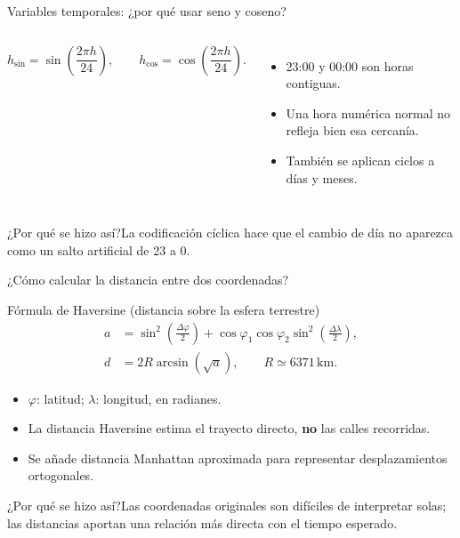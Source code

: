 \documentclass[aspectratio=169,11pt]{beamer}
\newcommand{\porq}[1]{\vspace{1.2mm}\begin{block}{¿Por qué se hizo así?}\small #1\end{block}}
\begin{document}
\begin{frame}{Variables temporales: ¿por qué usar seno y coseno?}
\begin{columns}[T]
\[
 h_{\sin}=\sin\left(\frac{2\pi h}{24}\right),\qquad
 h_{\cos}=\cos\left(\frac{2\pi h}{24}\right).
\]
\begin{itemize}
\item 23:00 y 00:00 son horas contiguas.
\item Una hora numérica normal no refleja bien esa cercanía.
\item También se aplican ciclos a días y meses.
\end{itemize}
\centering
{}
\end{columns}
\porq{La codificación cíclica hace que el cambio de día no aparezca como un salto artificial de 23 a 0.}
\end{frame}

\begin{frame}{¿Cómo calcular la distancia entre dos coordenadas?}
\begin{block}{Fórmula de Haversine (distancia sobre la esfera terrestre)}
\small
\[
\begin{aligned}
 a&=\sin^2\!\left(\frac{\Delta\varphi}{2}\right)
 +\cos\varphi_1\cos\varphi_2\sin^2\!\left(\frac{\Delta\lambda}{2}\right),\\[-1mm]
 d&=2R\arcsin(\sqrt{a}), \qquad R\simeq 6371\,\mathrm{km}.
\end{aligned}
\]
\end{block}
\begin{itemize}
\item $\varphi$: latitud; $\lambda$: longitud, en radianes.
\item La distancia Haversine estima el trayecto directo, \textbf{no} las calles recorridas.
\item Se añade distancia Manhattan aproximada para representar desplazamientos ortogonales.
\end{itemize}
\porq{Las coordenadas originales son difíciles de interpretar solas; las distancias aportan una relación más directa con el tiempo esperado.}
\end{frame}
\end{document}
